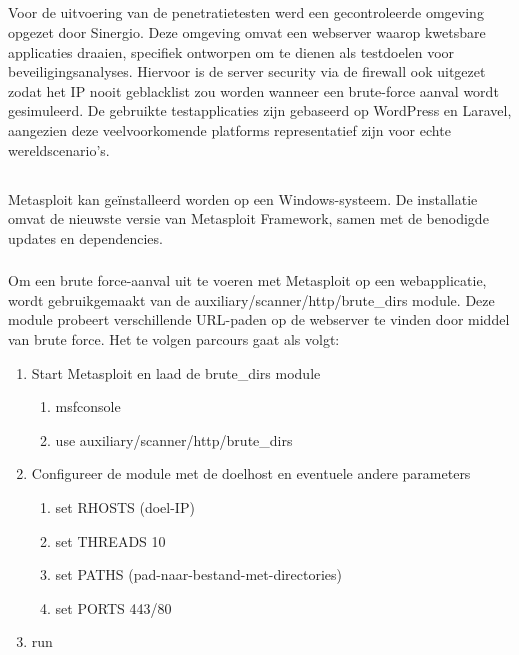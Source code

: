 \subsection{}
Voor de uitvoering van de penetratietesten werd een gecontroleerde omgeving opgezet door Sinergio. Deze omgeving omvat een webserver waarop kwetsbare 
applicaties draaien, specifiek ontworpen om te dienen als testdoelen voor beveiligingsanalyses. Hiervoor is de server security via de firewall ook uitgezet zodat 
het IP nooit geblacklist zou worden wanneer een brute-force aanval wordt gesimuleerd. De gebruikte testapplicaties zijn gebaseerd 
op WordPress en Laravel, aangezien deze veelvoorkomende platforms representatief zijn voor echte wereldscenario's.

\subsection{}
Metasploit kan geïnstalleerd worden op een Windows-systeem. De installatie omvat de nieuwste versie van Metasploit Framework, samen met de 
benodigde updates en dependencies.

\subsubsection{}
Om een brute force-aanval uit te voeren met Metasploit op een webapplicatie, wordt gebruikgemaakt van de auxiliary\slash scanner\slash http\slash brute\_dirs
module. Deze module probeert verschillende URL-paden op de webserver te vinden door middel van brute force.
Het te volgen parcours gaat als volgt:
\begin{enumerate}
    \item Start Metasploit en laad de brute\_dirs module
    \begin{enumerate}
        \item msfconsole
        \item use auxiliary\slash scanner\slash http\slash brute\_dirs
    \end{enumerate}
    \item Configureer de module met de doelhost en eventuele andere parameters
    \begin{enumerate}
        \item set RHOSTS (doel-IP)
        \item set THREADS 10
        \item set PATHS (pad-naar-bestand-met-directories)
        \item set PORTS 443\slash 80 
    \end{enumerate}
    \item run
\end{enumerate}
